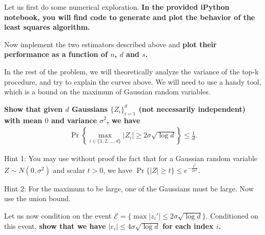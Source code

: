 \documentclass[preview]{standalone}
\begin{document}
\begin{Parts}
\Part Let us first do some numerical exploration. {\bf In the provided iPython notebook, you will find code to generate and plot the behavior of the least squares algorithm.}



\Part Now implement the two estimators described above and {\bf plot their performance as a function of $n$, $d$ and $s$.}






\Part In the rest of the problem, we will theoretically analyze the variance of the top-k procedure, and try to explain the curves above. We will need to use a handy tool, which is a bound on the maximum of Gaussian random variables.

{\bf Show that given $d$ Gaussians $\{Z_i\}_{i=1}^d$ (not necessarily independent) with mean $0$ and variance $\sigma^2$, we have}
\begin{align*}
\Pr \left\{ \max_{i \in \{1, 2, \ldots, d\}} |Z_i| \geq 2 \sigma \sqrt{\log d} \right\} \leq \frac{1}{d}.
\end{align*}

Hint 1: You may use without proof the fact that for a Gaussian random variable $Z \sim N(0, \sigma^2)$ and scalar $t > 0$, we have $\Pr\{|Z| \geq t\} \leq e^{- \frac{t^2}{2\sigma^2}}$.

Hint 2: For the maximum to be large, one of the Gaussians must be large. Now use the union bound.









\Part Let us now condition on the event $\mathcal{E} = \{\max |z_i'| \leq 2 \sigma \sqrt{\log d} \}$. Conditioned on this event, {\bf show that we have $|e_i| \leq 4 \sigma \sqrt{\log d}$ for each index $i$.}




\end{Parts}
\end{document}
